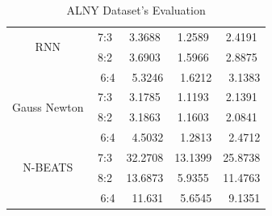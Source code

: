 \documentclass{ieeeojies}
\begin{document}
\begin{table}[H]
\begin{tabular}{|c|c|c|c|c|}
         \multirow{2}{*}{RNN} & 7:3 & 3.3688 & 1.2589 & 2.4191 \\ & 8:2 & 3.6903 & 1.5966 & 2.8875 \\ & \ 6:4} & \ 5.3246 & \ 1.6212 & \ 3.1383\\
         \hline
         \multirow{2}{*}{Gauss Newton} & 7:3 & 3.1785 & 1.1193 & 2.1391 \\ & 8:2 & 3.1863 & 1.1603 & 2.0841\\ & \ 6:4} & \ 4.5032 & \ 1.2813 & \ 2.4712\\
         \hline
         \multirow{2}{*}{N-BEATS} & 7:3 & 32.2708 & 13.1399 & 25.8738 \\ & 8:2 & 13.6873 & 5.9355 & 11.4763\\ & \ 6:4} & \ 11.631 & \ 5.6545 & \ 9.1351\\
         \hline
    \end{tabular}
    \caption{ALNY Dataset's Evaluation}
    \label{ALNYresult}
\end{table}
\end{document}

